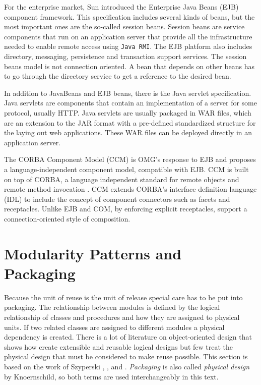 For the enterprise market, Sun introduced the Enterprise Java Beans (EJB) component framework. This specification includes several kinds of beans,
but the most important ones are the so-called session beans. Session beans are service components that run on an application server that provide
all the infrastructure needed to enable remote access using \texttt{Java RMI}. The EJB platform also includes directory, messaging, persistence and
transaction support services. The session beans model is not connection oriented. A bean that depends on other beans has to go through the
directory service to get a reference to the desired bean.

In addition to JavaBeans and EJB beans, there is the Java servlet specification. Java servlets are components that contain an implementation
of a server for some protocol, usually HTTP. Java servlets are usually packaged in WAR files, which are an extension to the JAR format
with a pre-defined standardized structure for the laying out web applications. These WAR files can be deployed directly in an application server.

The CORBA Component Model (CCM) is OMG's response to EJB and proposes a language-independent component model, compatible with EJB. CCM is built
on top of CORBA, a language independent standard for remote objects and remote method invocation \cite{CCM}. CCM extends CORBA's interface definition language
(IDL) to include the concept of component connectors such as facets and receptacles. Unlike EJB and COM, by enforcing explicit receptacles, support
a connection-oriented style of composition.

\section{Modularity Patterns and Packaging}
\label{sec:patterns}

Because the unit of reuse is the unit of release special care has to be put into packaging.
The relationship between modules is defined by the logical relationship of classes and procedures
and how they are assigned to physical units. If two related classes are assigned to different
modules a physical dependency is created. There is a lot of literature on object-oriented design
that shows how create extensible and reusable logical designs but few treat the physical design
that must be considered to make reuse possible. This section is based on the work of Szyperski
\cite{Szyperski}, \cite{Lakos}, \cite{Martin} and \cite{Knoernschild}. \emph{Packaging} is also called
\emph{physical design} by Knoernschild, so both terms are used interchangeably in this text.

